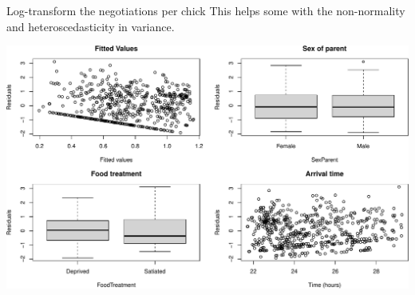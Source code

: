 \documentclass[
  ignorenonframetext,
]{beamer}
\newenvironment{Shaded}{\begin{snugshade}}{\end{snugshade}}
\newcommand{\AttributeTok}[1]{\textcolor[rgb]{0.77,0.63,0.00}{#1}}
\newcommand{\DecValTok}[1]{\textcolor[rgb]{0.00,0.00,0.81}{#1}}
\newcommand{\FunctionTok}[1]{\textcolor[rgb]{0.00,0.00,0.00}{#1}}
\newcommand{\NormalTok}[1]{#1}
\newcommand{\OtherTok}[1]{\textcolor[rgb]{0.56,0.35,0.01}{#1}}
\newcommand{\SpecialCharTok}[1]{\textcolor[rgb]{0.00,0.00,0.00}{#1}}
\begin{document}
\begin{frame}[fragile]{Log-transform the negotiations per chick}
\protect\hypertarget{log-transform-the-negotiations-per-chick}{}
This helps some with the non-normality and heteroscedasticity in
variance.

\scriptsize

\begin{Shaded}
\end{Shaded}

\includegraphics{mixed_models_files/figure-beamer/unnamed-chunk-13-1.pdf}
\end{frame}
\end{document}
